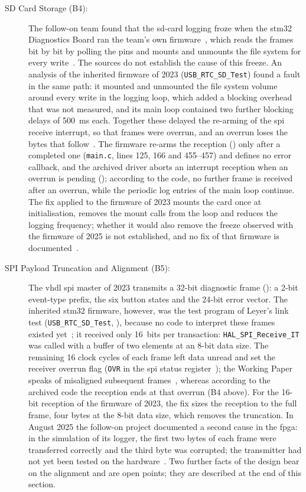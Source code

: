 \begin{description}
	\item[SD Card Storage (B4):] The follow-on team found that the \gls{sd}-card logging froze when the \gls{stm32} Diagnostics Board ran the team's own firmware~\cite[pp.~19, 22]{savchuk2025}, which reads the frames bit by bit by polling the pins and mounts and unmounts the file system for every write~\cite[pp.~16--18]{savchuk2025}. The sources do not establish the cause of this freeze. An analysis of the inherited firmware of 2023 (\texttt{USB\_RTC\_SD\_Test}) found a fault in the same path: it mounted and unmounted the file system volume around every write in the logging loop, which added a blocking overhead that was not measured, and its main loop contained two further blocking delays of \SI{500}{\milli\second} each. Together these delayed the re-arming of the \gls{spi} receive interrupt, so that frames were overrun, and an overrun loses the bytes that follow~\cite[Sec.~20.3.10]{st_rm0368}. The firmware re-arms the reception () only after a completed one (\texttt{main.c}, lines 125, 166 and 455--457) and defines no error callback, and the archived driver  aborts an interrupt reception when an overrun is pending (); according to the code, no further frame is received after an overrun, while the periodic log entries of the main loop continue. The fix applied to the firmware of 2023 mounts the card once at initialisation, removes the mount calls from the loop and reduces the logging frequency; whether it would also remove the freeze observed with the firmware of 2025 is not established, and no fix of that firmware is documented~\cite[pp.~16--19, 22]{savchuk2025}.
	\item[SPI Payload Truncation and Alignment (B5):] The \gls{vhdl} \gls{spi} master of 2023 transmits a 32-bit diagnostic frame (): a 2-bit event-type prefix, the six button states and the 24-bit error vector. The inherited \gls{stm32} firmware, however, was the test program of Leyer's link test (\texttt{USB\_RTC\_SD\_Test}, ), because no code to interpret these frames existed yet~\cite[Sec.~3.3]{leyer2023}; it received only 16~bits per transaction: \texttt{HAL\_SPI\_Receive\_IT} was called with a buffer of two elements at an 8-bit data size. The remaining 16 clock cycles of each frame left data unread and set the receiver overrun flag (\texttt{OVR} in the \gls{spi} status register~\cite[Sec.~20.3.10]{st_rm0368}); the Working Paper speaks of misaligned subsequent frames~\cite[Sec.~V-E]{torun2026}, whereas according to the archived code the reception ends at that overrun (B4 above). For the 16-bit reception of the firmware of 2023, the fix sizes the reception to the full frame, four bytes at the 8-bit data size, which removes the truncation. In August 2025 the follow-on project documented a second cause in the \gls{fpga}: in the simulation of its logger, the first two bytes of each frame were transferred correctly and the third byte was corrupted; the transmitter had not yet been tested on the hardware~\cite[p.~21]{savchuk2025}. Two further facts of the design bear on the alignment and are open points; they are described at the end of this section.

\end{description}
